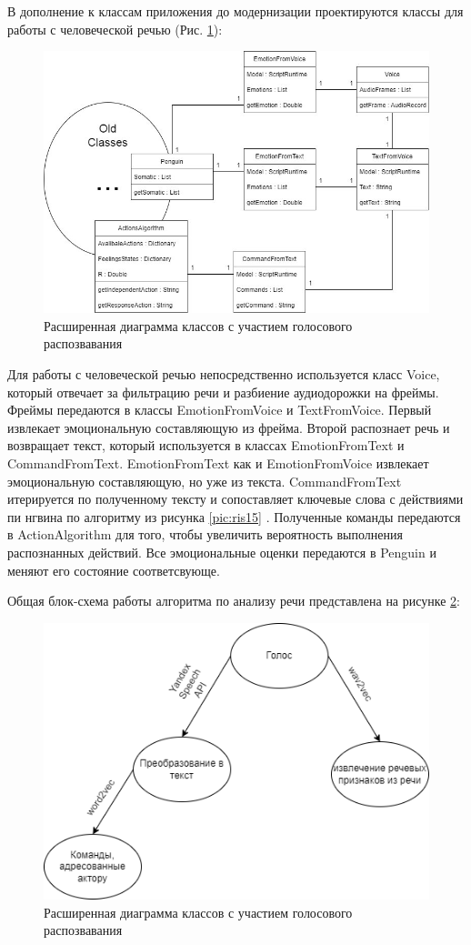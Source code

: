 В дополнение к классам приложения до модернизации проектируются классы для работы с человеческой речью (Рис. \ref{pic:ncmodel0}):

\begin{figure}[!h]
\includegraphics[width=0.75\columnwidth]{./img/ncmodel0.jpg}
\centering
\caption{Расширенная диаграмма классов с участием голосового распозвавания}
\label{pic:ncmodel0}
\end{figure}

Для работы с человеческой речью непосредственно используется класс Voice, который отвечает за фильтрацию речи и разбиение аудиодорожки на фреймы. 
Фреймы передаются в классы EmotionFromVoice   
и TextFromVoice. Первый извлекает эмоциональную составляющую из фрейма. Второй распознает речь   
и возвращает текст, который используется в классах EmotionFromText и CommandFromText.   
EmotionFromText как и EmotionFromVoice извлекает эмоциональную составляющую, но уже из текста. 
CommandFromText итерируется по полученному тексту и сопоставляет ключевые слова с действиями пи  
нгвина по алгоритму из рисунка \ref{pic:ris15} . Полученные команды передаются в   
ActionAlgorithm для того, чтобы увеличить вероятность выполнения распознанных действий. Все эмоциональные 
оценки передаются в Penguin и меняют его состояние соответсвующе.

Общая блок-схема работы алгоритма по анализу речи представлена на рисунке \ref{pic:block_schema}: 
\begin{figure}[!h]
  \includegraphics[width=0.75\columnwidth]{./img/block_schema.png}
  \centering
  \caption{Расширенная диаграмма классов с участием голосового распозвавания}
  \label{pic:block_schema}
  \end{figure}

